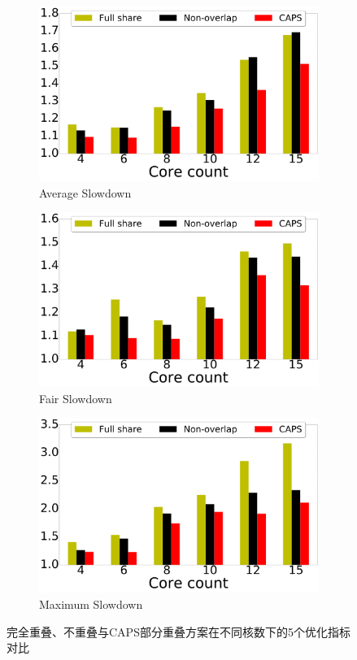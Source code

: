 \begin{figure}[htbp]
\begin{subfigure}[b]{0.5\linewidth}
    \end{subfigure}
    \begin{subfigure}[b]{0.5\linewidth}
        \centering\includegraphics[width=0.9\linewidth]{figures/ws.pdf}
        \caption{Average Slowdown}
    \end{subfigure}%
    \begin{subfigure}[b]{0.5\linewidth}
        \centering\includegraphics[width=0.9\linewidth]{figures/fs.pdf}
        \caption{Fair Slowdown}
    \end{subfigure}
    \begin{subfigure}[b]{0.5\linewidth}
        \centering\includegraphics[width=0.9\linewidth]{figures/ms.pdf}
        \caption{Maximum Slowdown}
    \end{subfigure}
    \caption{完全重叠、不重叠与CAPS部分重叠方案在不同核数下的5个优化指标对比}
    \label{fig:core_count}
\end{figure}

